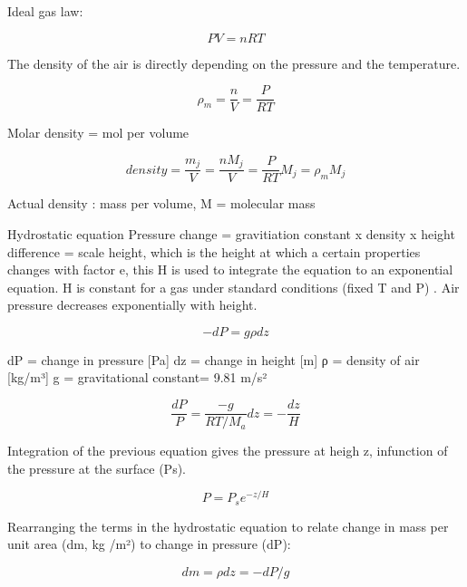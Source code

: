 \documentclass[oneside]{book}
\begin{document}
Ideal gas law:

\begin{equation} 
  PV = nRT
   \label{eq:Eqgaslaw}
\end{equation}

The density of the air is directly depending on the pressure and the
temperature.

\begin{equation} 
  \rho_m = \frac{n}{V} = \frac{P}{RT}
  \label{eq:Eqairdensity}
\end{equation}

Molar density = mol per volume

\begin{equation} 
  density = \frac{m_j}{V} = \frac{nM_j}{V} = \frac{P}{RT}M_j = \rho_m M_j
   \label{eq:Eqdensity}
\end{equation}

Actual density : mass per volume, M = molecular mass

Hydrostatic equation Pressure change = gravitiation constant x density x
height difference = scale height, which is the height at which a certain
properties changes with factor e, this H is used to integrate the
equation to an exponential equation. H is constant for a gas under
standard conditions (fixed T and P) . Air pressure decreases
exponentially with height.

\begin{equation} 
  -dP = g \rho dz
   \label{eq:Eqhydrostatic}
\end{equation}

dP = change in pressure {[}Pa{]} dz = change in height {[}m{]} ρ =
density of air {[}kg/m³{]} g = gravitational constant= 9.81 m/s²

\begin{equation} 
  \frac{dP}{P} = \frac{-g}{RT / M_a}  dz = - \frac{dz}{H}
   \label{eq:Eqhydrostatic2}
\end{equation}

Integration of the previous equation gives the pressure at heigh z,
infunction of the pressure at the surface (Ps).

\begin{equation} 
  P = P_s e^{-z/H}
   \label{eq:Eqhydrostatic3}
\end{equation}

Rearranging the terms in the hydrostatic equation to relate change in
mass per unit area (dm, kg /m²) to change in pressure (dP):

\begin{equation} 
  dm = \rho dz = - dP / g
   \label{eq:Eqhydrostatic4}
\end{equation}
\end{document}
